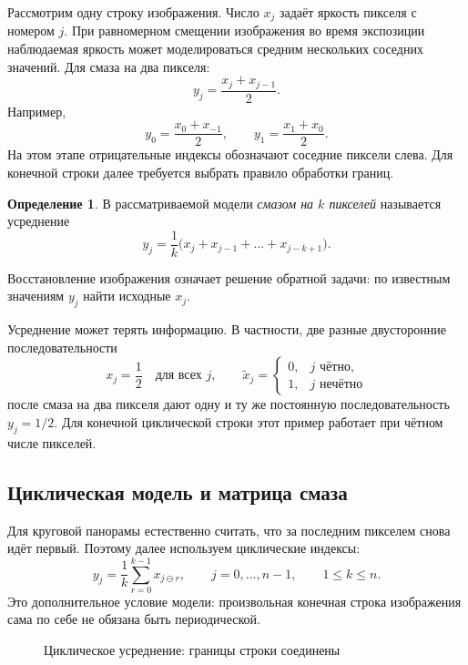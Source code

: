 \documentclass[12pt,a4paper]{article}
\theoremstyle{definition}
\newtheorem{definition}{Определение}
\theoremstyle{remark}
\begin{document}
Рассмотрим одну строку изображения. Число $x_j$ задаёт яркость пикселя
с номером $j$. При равномерном смещении изображения во время экспозиции
наблюдаемая яркость может моделироваться средним нескольких соседних
значений. Для смаза на два пикселя:
\[
  y_j=\frac{x_j+x_{j-1}}2.
\]
Например,
\[
  y_0=\frac{x_0+x_{-1}}2,\qquad
  y_1=\frac{x_1+x_0}2.
\]
На этом этапе отрицательные индексы обозначают соседние пиксели слева.
Для конечной строки далее требуется выбрать правило обработки границ.

\begin{definition}
В рассматриваемой модели \emph{смазом на $k$ пикселей} называется
усреднение
\[
  y_j=\frac1k\bigl(x_j+x_{j-1}+\dots+x_{j-k+1}\bigr).
\]
\end{definition}

Восстановление изображения означает решение обратной задачи: по
известным значениям $y_j$ найти исходные $x_j$.

Усреднение может терять информацию. В частности, две разные
двусторонние последовательности
\[
  x_j=\frac12\quad\text{для всех }j,
  \qquad
  \widetilde x_j=\begin{cases}0,&j\text{ чётно},\\1,&j\text{ нечётно}\end{cases}
\]
после смаза на два пикселя дают одну и ту же постоянную последовательность
$y_j=1/2$. Для конечной циклической строки этот пример работает при
чётном числе пикселей.

\subsection{Циклическая модель и матрица смаза}

Для круговой панорамы естественно считать, что за последним пикселем
снова идёт первый. Поэтому далее используем циклические индексы:
\[
  y_j=\frac1k\sum_{r=0}^{k-1}x_{j\ominus r},
  \qquad j=0,\dots,n-1,\qquad 1\leqslant k\leqslant n.
\]
Это дополнительное условие модели: произвольная конечная строка
изображения сама по себе не обязана быть периодической.

\begin{figure}[ht]
  \centering
  \caption{Циклическое усреднение: границы строки соединены}
\end{figure}
\end{document}
